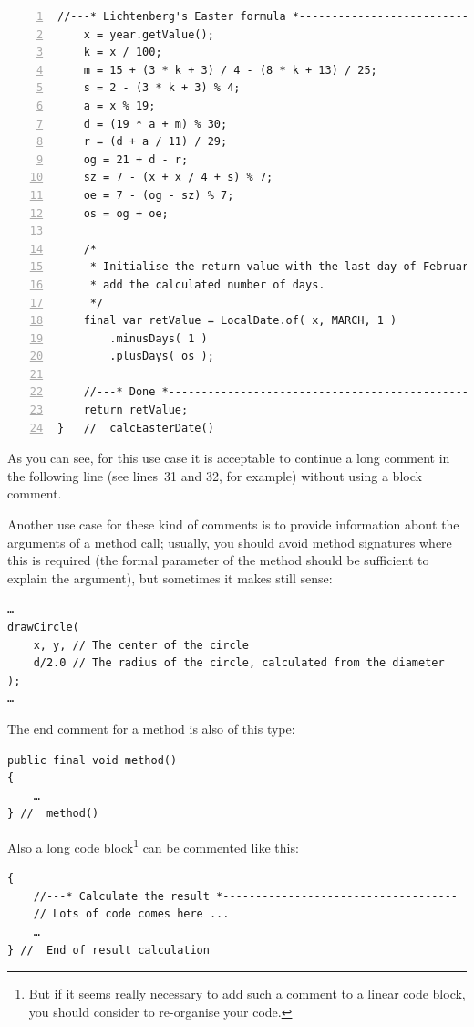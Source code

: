 \documentclass[11pt,a4paper, titlepage, parskip=half, headsepline, footsepline, cleardoublepage=current, headheight=1cm]{scrbook}
\begin{document}
\begin{lstlisting}[numbers=left,caption={Gauss' Easter algorithm\autocite{WIKIPEDIA:DateOfEaster,WIKIPEDIA:Gaussche_Osterformel}},label={listing:GaussEaster}]
    //---* Lichtenberg's Easter formula *----------------------------
    x = year.getValue();
    k = x / 100;    
    m = 15 + (3 * k + 3) / 4 - (8 * k + 13) / 25;
    s = 2 - (3 * k + 3) % 4;
    a = x % 19;
    d = (19 * a + m) % 30;
    r = (d + a / 11) / 29;
    og = 21 + d - r;
    sz = 7 - (x + x / 4 + s) % 7;
    oe = 7 - (og - sz) % 7;
    os = og + oe;

    /*
     * Initialise the return value with the last day of February and 
     * add the calculated number of days.
     */
    final var retValue = LocalDate.of( x, MARCH, 1 )
        .minusDays( 1 )
        .plusDays( os );

    //---* Done *----------------------------------------------------
    return retValue;
}   //  calcEasterDate()
\end{lstlisting}

As you can see, for this use case it is acceptable to continue a long comment in the following line (see lines~31 and 32, for example) without using a block comment.

Another use case for these kind of comments is to provide information about the arguments of a method call; usually, you should avoid method signatures where this is required (the formal parameter of the method should be sufficient to explain the argument), but sometimes it makes still sense:
\begin{lstlisting}
…
drawCircle(
    x, y, // The center of the circle
    d/2.0 // The radius of the circle, calculated from the diameter
);
…
\end{lstlisting}

The end comment for a method is also of this type:
\begin{lstlisting}
public final void method()
{
    …
} //  method()
\end{lstlisting}

Also a long code block\footnote{But if it seems really necessary to add such a comment to a linear code block, you should consider to re-organise your code.} can be commented like this:
\begin{lstlisting}
{
    //---* Calculate the result *------------------------------------
    // Lots of code comes here ...
    …
} //  End of result calculation
\end{lstlisting}
\end{document}
